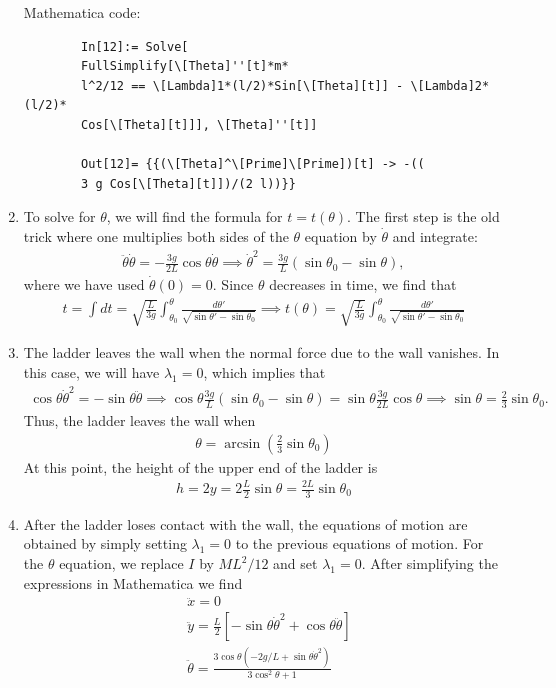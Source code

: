 \documentclass{article}
\theoremstyle{definition}
\newcommand{\f}[2]{\frac{#1}{#2}}
\newcommand{\lp}{\left(}
\newcommand{\rp}{\right)}
\newcommand{\lb}{\left[}
\newcommand{\rb}{\right]}
\begin{document}
\begin{enumerate}[label = (\alph*)]
		Mathematica code:
		\begin{lstlisting}
		In[12]:= Solve[
		FullSimplify[\[Theta]''[t]*m*
		l^2/12 == \[Lambda]1*(l/2)*Sin[\[Theta][t]] - \[Lambda]2*(l/2)*
		Cos[\[Theta][t]]], \[Theta]''[t]]
		
		Out[12]= {{(\[Theta]^\[Prime]\[Prime])[t] -> -((
		3 g Cos[\[Theta][t]])/(2 l))}}
		\end{lstlisting}
		
		\item To solve for $\theta$, we will find the formula for $t=t(\theta)$. The first step is the old trick where one multiplies both sides of the $\theta$ equation by $\dot\theta$ and integrate: 
		\begin{align*}
		\ddot\theta \dot \theta = -\f{3g}{2L}\cos\theta \dot\theta \implies \dot\theta^2 = \f{3g}{L}(\sin\theta_0-\sin\theta),
		\end{align*}
		where we have used $\dot\theta(0) = 0$. Since $\theta$ decreases in time, we find that
		\begin{align*}
		t = \int dt = \sqrt{\f{L}{3g}}\int_{\theta_0}^{\theta} \f{d\theta'}{\sqrt{\sin\theta'-\sin\theta_0}} \implies \boxed{t(\theta) = \sqrt{\f{L}{3g}}\int_{\theta_0}^{\theta} \f{d\theta'}{\sqrt{\sin\theta'-\sin\theta_0}}}
		\end{align*}
		
		\item The ladder leaves the wall when the normal force due to the wall vanishes. In this case, we will have $\lambda_1 = 0$, which implies that
		\begin{align*}
		\cos\theta \dot\theta^2 = -\sin\theta\ddot\theta \implies \cos\theta \f{3g}{L}(\sin\theta_0-\sin\theta) = \sin\theta \f{3g}{2L}\cos\theta \implies \sin\theta = \f{2}{3}\sin\theta_0.
		\end{align*}
		Thus, the ladder leaves the wall when 
		\begin{align*}
		\boxed{\theta = \arcsin\lp \f{2}{3}\sin\theta_0 \rp}
		\end{align*}
		At this point, the height of the upper end of the ladder is 
		\begin{align*}
		h = 2y = 2\f{L}{2} \sin\theta = \boxed{\f{2L}{3}\sin\theta_0}
		\end{align*}
		
		\item After the ladder loses contact with the wall, the equations of motion are obtained by simply setting $\lambda_1 =0$ to the previous equations of motion. For the $\theta$ equation, we replace $I$ by $ML^2/12$ and set $\lambda_1 = 0$. After simplifying the expressions in Mathematica we find 
		\begin{align*}
		&\boxed{\ddot{x} = 0}\\
		&\boxed{\ddot{y} = \f{L}{2}\lb -\sin\theta \dot\theta^2 + \cos\theta \ddot\theta \rb  }\\
		&\boxed{\ddot\theta= \frac{3\cos \theta \left(-2g/L + \sin\theta \dot\theta^2\right)}{ 3\cos^2\theta+1}}
		\end{align*}
		

\end{enumerate}
\end{document}
